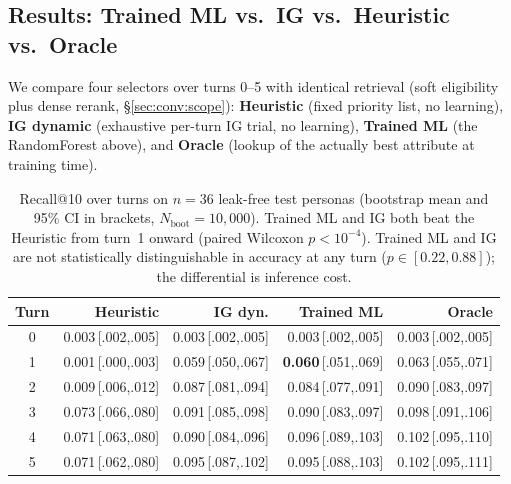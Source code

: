 \documentclass{article}
\begin{document}
\subsection{Results: Trained ML vs.\ IG vs.\ Heuristic vs.\ Oracle}
\label{sec:conv:result}

We compare four selectors over turns 0--5 with identical retrieval
(soft eligibility plus dense rerank, \S\ref{sec:conv:scope}):
\textbf{Heuristic} (fixed priority list, no learning),
\textbf{IG dynamic} (exhaustive per-turn IG trial, no learning),
\textbf{Trained ML} (the RandomForest above), and \textbf{Oracle}
(lookup of the actually best attribute at training time).

\begin{table}[t]
\centering\footnotesize
\setlength{\tabcolsep}{3pt}
\renewcommand{\arraystretch}{1.08}
\begin{tabular}{c@{\hspace{5pt}}rrrr}
\toprule
Turn & Heuristic & IG dyn. & \textbf{Trained ML} & Oracle \\
\midrule
0 & 0.003\,{\tiny[.002,.005]} & 0.003\,{\tiny[.002,.005]} & 0.003\,{\tiny[.002,.005]} & 0.003\,{\tiny[.002,.005]} \\
1 & 0.001\,{\tiny[.000,.003]} & 0.059\,{\tiny[.050,.067]} & \textbf{0.060}\,{\tiny[.051,.069]} & 0.063\,{\tiny[.055,.071]} \\
2 & 0.009\,{\tiny[.006,.012]} & 0.087\,{\tiny[.081,.094]} & 0.084\,{\tiny[.077,.091]} & 0.090\,{\tiny[.083,.097]} \\
3 & 0.073\,{\tiny[.066,.080]} & 0.091\,{\tiny[.085,.098]} & 0.090\,{\tiny[.083,.097]} & 0.098\,{\tiny[.091,.106]} \\
4 & 0.071\,{\tiny[.063,.080]} & 0.090\,{\tiny[.084,.096]} & 0.096\,{\tiny[.089,.103]} & 0.102\,{\tiny[.095,.110]} \\
5 & 0.071\,{\tiny[.062,.080]} & 0.095\,{\tiny[.087,.102]} & 0.095\,{\tiny[.088,.103]} & 0.102\,{\tiny[.095,.111]} \\
\bottomrule
\end{tabular}
\caption{Recall@10 over turns on $n{=}36$ leak-free test personas
(bootstrap mean and 95\% CI in brackets,
$N_{\mathrm{boot}}{=}10{,}000$). Trained ML and IG both beat the
Heuristic from turn~1 onward (paired Wilcoxon $p{<}10^{-4}$).
Trained ML and IG are not statistically distinguishable in accuracy
at any turn ($p\in[0.22,0.88]$); the differential is inference
cost.}
\label{tab:conv}
\end{table}
\end{document}
